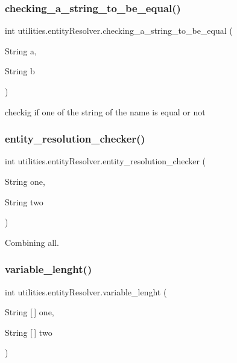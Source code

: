 \subsubsection{\texorpdfstring{checking\+\_\+a\+\_\+string\+\_\+to\+\_\+be\+\_\+equal()}{checking\_a\_string\_to\_be\_equal()}}
{\footnotesize\ttfamily int utilities.\+entity\+Resolver.\+checking\+\_\+a\+\_\+string\+\_\+to\+\_\+be\+\_\+equal (\begin{DoxyParamCaption}\item[{String}]{a,  }\item[{String}]{b }\end{DoxyParamCaption})}



checkig if one of the string of the name is equal or not 

\hypertarget{classutilities_1_1entity_resolver_af9ca73ff07de65c6f70b958ab5569adf}{}\label{classutilities_1_1entity_resolver_af9ca73ff07de65c6f70b958ab5569adf} 
\subsubsection{\texorpdfstring{entity\+\_\+resolution\+\_\+checker()}{entity\_resolution\_checker()}}
{\footnotesize\ttfamily int utilities.\+entity\+Resolver.\+entity\+\_\+resolution\+\_\+checker (\begin{DoxyParamCaption}\item[{String}]{one,  }\item[{String}]{two }\end{DoxyParamCaption})}



Combining all. 

\hypertarget{classutilities_1_1entity_resolver_a695716e282e5c008a3d72f13103f145e}{}\label{classutilities_1_1entity_resolver_a695716e282e5c008a3d72f13103f145e} 
\subsubsection{\texorpdfstring{variable\+\_\+lenght()}{variable\_lenght()}}
{\footnotesize\ttfamily int utilities.\+entity\+Resolver.\+variable\+\_\+lenght (\begin{DoxyParamCaption}\item[{String \mbox{[}$\,$\mbox{]}}]{one,  }\item[{String \mbox{[}$\,$\mbox{]}}]{two }\end{DoxyParamCaption})}



